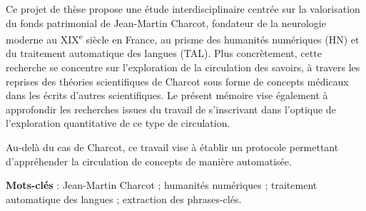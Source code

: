 
%


Ce projet de thèse propose une étude interdisciplinaire centrée sur la valorisation du fonds patrimonial de Jean-Martin Charcot, fondateur de la neurologie moderne au XIX\textsuperscript{e} siècle en France, au prisme des humanités numériques (\textsc{HN}) et du traitement automatique des langues (\textsc{TAL}). Plus concrètement, cette recherche se concentre sur l'exploration de la circulation des savoirs, à travers les reprises des théories scientifiques de Charcot sous forme de concepts médicaux dans les écrits d'autres scientifiques. Le présent mémoire vise également à approfondir les recherches issues du travail de \citet{petkovic2023circulation} s'inscrivant dans l'optique de l'exploration quantitative de ce type de circulation. 


Au-delà du cas de Charcot, ce travail vise à établir un protocole permettant d'appréhender la circulation de concepts de manière automatisée.


\textbf{Mots-clés} : Jean-Martin Charcot ; humanités numériques ; traitement automatique des langues ; extraction des phrases-clés.
